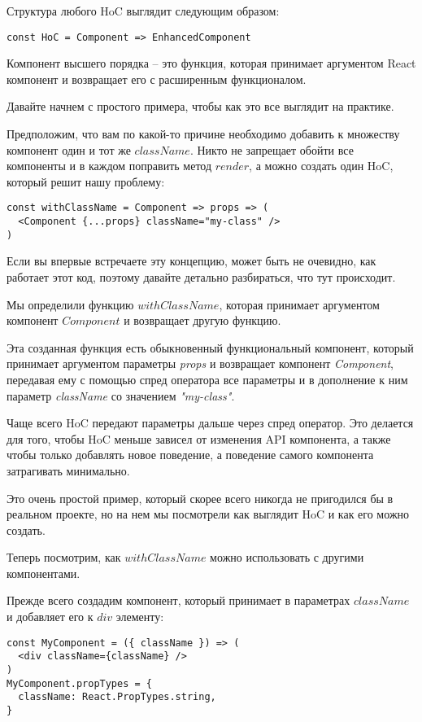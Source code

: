Структура любого HoC выглядит следующим образом:

\begin{lstlisting}
const HoC = Component => EnhancedComponent
\end{lstlisting}

Компонент высшего порядка -- это функция, которая принимает аргументом React компонент и возвращает его с расширенным функционалом.

Давайте начнем с простого примера, чтобы как это все выглядит на практике.

Предположим, что вам по какой-то причине необходимо добавить к множеству компонент один и тот же $className$. Никто не запрещает обойти все компоненты и в каждом поправить метод $render$, а можно создать один HoC, который решит нашу проблему:

\begin{lstlisting}
const withClassName = Component => props => (
  <Component {...props} className="my-class" />
)
\end{lstlisting}

Если вы впервые встречаете эту концепцию, может быть не очевидно, как работает этот код, поэтому давайте детально разбираться, что тут происходит.

Мы определили функцию $withClassName$, которая принимает аргументом компонент $Component$ и возвращает другую функцию.

Эта созданная функция есть обыкновенный функциональный компонент, который принимает аргументом параметры \textit{props} и возвращает компонент \textit{Component}, передавая ему с помощью спред оператора все параметры и в дополнение к ним параметр \textit{className} со значением \textit{"my-class"}. 

Чаще всего HoC передают параметры дальше через спред оператор. Это делается для того, чтобы HoC меньше зависел от изменения API компонента, а также чтобы только добавлять новое поведение, а поведение самого компонента затрагивать минимально.

Это очень простой пример, который скорее всего никогда не пригодился бы в реальном проекте, но на нем мы посмотрели как выглядит HoC и как его можно создать.

Теперь посмотрим, как $withClassName$ можно использовать с другими компонентами.

Прежде всего создадим компонент, который принимает в параметрах $className$ и добавляет его к $div$ элементу:

\begin{lstlisting}
const MyComponent = ({ className }) => (
  <div className={className} />
)
MyComponent.propTypes = {
  className: React.PropTypes.string,
}
\end{lstlisting}

